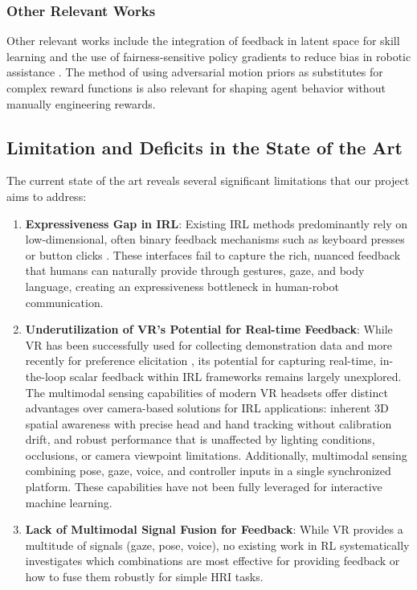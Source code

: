 \documentclass[rnd]{mas_proposal}
\begin{document}
\subsubsection{Other Relevant Works}
Other relevant works include the integration of feedback in latent space for skill learning \citep{8624972} and the use of fairness-sensitive policy gradients to reduce bias in robotic assistance \citep{10731257}. The method of using adversarial motion priors as substitutes for complex reward functions \citep{Escontrela2022} is also relevant for shaping agent behavior without manually engineering rewards.


\subsection{Limitation and Deficits in the State of the Art}
The current state of the art reveals several significant limitations that our project aims to address:
\begin{enumerate}
    \item \textbf{Expressiveness Gap in IRL}: Existing IRL methods predominantly rely on low-dimensional, often binary feedback mechanisms such as keyboard presses or button clicks \citep{Faulkner2020, Loftin2014}. These interfaces fail to capture the rich, nuanced feedback that humans can naturally provide through gestures, gaze, and body language, creating an expressiveness bottleneck in human-robot communication.
    
    \item \textbf{Underutilization of VR's Potential for Real-time Feedback}: While VR has been successfully used for collecting demonstration data \citep{10904309, Mosbach2022} and more recently for preference elicitation \citep{Heuvel2025}, its potential for capturing real-time, in-the-loop scalar feedback within IRL frameworks remains largely unexplored. The multimodal sensing capabilities of modern VR headsets offer distinct advantages over camera-based solutions for IRL applications: inherent 3D spatial awareness with precise head and hand tracking without calibration drift, and robust performance that is unaffected by lighting conditions, occlusions, or camera viewpoint limitations. Additionally,  multimodal sensing combining pose, gaze, voice, and controller inputs in a single synchronized platform. These capabilities have not been fully leveraged for interactive machine learning.
        
    \item \textbf{Lack of Multimodal Signal Fusion for Feedback}: While VR provides a multitude of signals (gaze, pose, voice), no existing work in RL systematically investigates which combinations are most effective for providing feedback or how to fuse them robustly for simple HRI tasks.
\end{enumerate}
\end{document}

